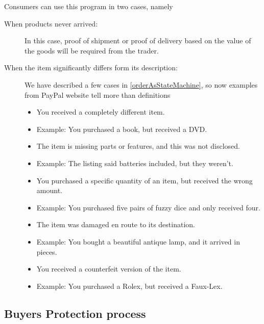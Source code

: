 \documentclass[thesis=M,english]{FITthesis}[2019/12/23]
\begin{document}
Consumers can use this program in two cases, namely
\begin{description}

\item[When products never arrived:]
In this case, proof of shipment or proof of delivery based on the value of the goods will be required from the trader.


\item[When the item significantly differs form its description:]
We have described a few cases in \ref{orderAsStateMachine}, so now examples from PayPal website tell more than definitions
\begin{itemize}
\item You received a completely different item. 
\item Example: You purchased a book, but received a DVD.
\item The item is missing parts or features, and this was not disclosed. 
\item Example: The listing said batteries included, but they weren't.
\item You purchased a specific quantity of an item, but received the wrong amount. 
\item Example: You purchased five pairs of fuzzy dice and only received four.
\item The item was damaged en route to its destination. 
\item Example: You bought a beautiful antique lamp, and it arrived in pieces.
\item You received a counterfeit version of the item.
\item Example: You purchased a Rolex, but received a Faux-Lex.
\end{itemize}
\end{description}


\subsection{Buyers Protection process}
\end{document}
